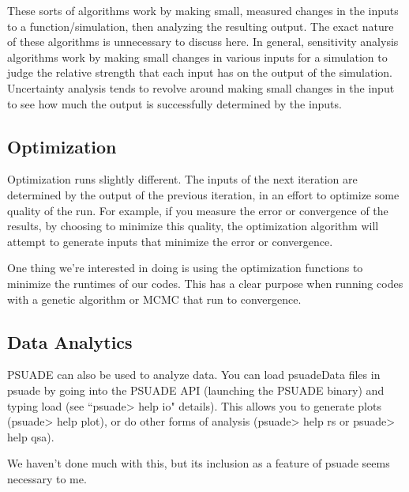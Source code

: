 These sorts of algorithms work by making small, measured changes in the inputs to a function/simulation, then analyzing the resulting output. The exact nature of these algorithms is unnecessary to discuss here. In general, sensitivity analysis algorithms work by making small changes in various inputs for a simulation to judge the relative strength that each input has on the output of the simulation. Uncertainty analysis tends to revolve around making small changes in the input to see how much the output is successfully determined by the inputs.

\subsection{Optimization}

Optimization runs slightly different. The inputs of the next iteration are determined by the output of the previous iteration, in an effort to optimize some quality of the run. For example, if you measure the error or convergence of the results, by choosing to minimize this quality, the optimization algorithm will attempt to generate inputs that minimize the error or convergence.

One thing we're interested in doing is using the optimization functions to minimize the runtimes of our codes. This has a clear purpose when running codes with a genetic algorithm or MCMC that run to convergence.

\subsection{Data Analytics}

PSUADE can also be used to analyze data. You can load psuadeData files in psuade by going into the PSUADE API (launching the PSUADE binary) and typing load (see ``psuade> help io" details). This allows you to generate plots (psuade> help plot), or do other forms of analysis (psuade> help rs or psuade> help qsa).

We haven't done much with this, but its inclusion as a feature of psuade seems necessary to me.
